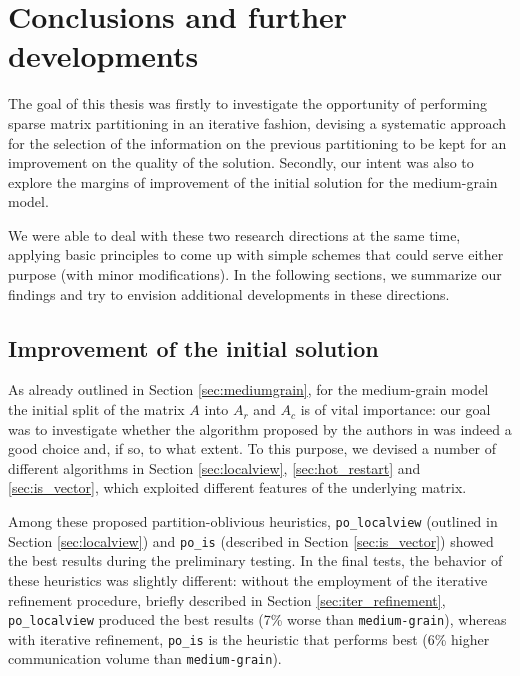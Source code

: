 \chapter{Conclusions and further developments} \label{chap:conclusions}

The goal of this thesis was firstly to investigate the opportunity of performing sparse matrix partitioning in an iterative fashion, devising a systematic approach for the selection of the information on the previous partitioning to be kept for an improvement on the quality of the solution. Secondly, our intent was also to explore the margins of improvement of the initial solution for the medium-grain model.

We were able to deal with these two research directions at the same time, applying basic principles to come up with simple schemes that could serve either purpose (with minor modifications). In the following sections, we summarize our findings and try to envision additional developments in these directions.

\section{Improvement of the initial solution} \label{sec:conclusions_po}

As already outlined in Section \ref{sec:mediumgrain}, for the medium-grain model the initial split of the matrix $A$ into $A_r$ and $A_c$ is of vital importance: our goal was to investigate whether the algorithm proposed by the authors in \cite{mediumgrain} was indeed a good choice and, if so, to what extent. To this purpose, we devised a number of different algorithms in Section \ref{sec:localview}, \ref{sec:hot_restart} and \ref{sec:is_vector}, which exploited different features of the underlying matrix. 

Among these proposed partition-oblivious heuristics, \verb|po_localview| (outlined in Section \ref{sec:localview}) and \verb|po_is| (described in Section \ref{sec:is_vector}) showed the best results during the preliminary testing. In the final tests, the behavior of these heuristics was slightly different: without the employment of the iterative refinement procedure, briefly described in Section \ref{sec:iter_refinement}, \verb|po_localview| produced the best results (7\% worse than \verb|medium-grain|), whereas with iterative refinement, \verb|po_is| is the heuristic that performs best (6\% higher communication volume than \verb|medium-grain|). 

